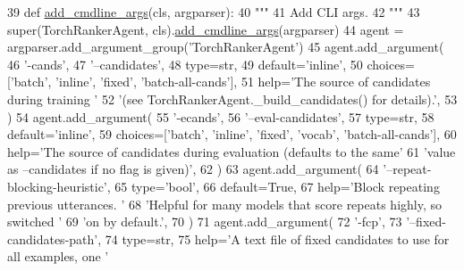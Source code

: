 \begin{DoxyCode}
39     \textcolor{keyword}{def }\hyperlink{namespaceparlai_1_1agents_1_1drqa_1_1config_a62fdd5554f1da6be0cba185271058320}{add\_cmdline\_args}(cls, argparser):
40         \textcolor{stringliteral}{"""}
41 \textcolor{stringliteral}{        Add CLI args.}
42 \textcolor{stringliteral}{        """}
43         super(TorchRankerAgent, cls).\hyperlink{namespaceparlai_1_1agents_1_1drqa_1_1config_a62fdd5554f1da6be0cba185271058320}{add\_cmdline\_args}(argparser)
44         agent = argparser.add\_argument\_group(\textcolor{stringliteral}{'TorchRankerAgent'})
45         agent.add\_argument(
46             \textcolor{stringliteral}{'-cands'},
47             \textcolor{stringliteral}{'--candidates'},
48             type=str,
49             default=\textcolor{stringliteral}{'inline'},
50             choices=[\textcolor{stringliteral}{'batch'}, \textcolor{stringliteral}{'inline'}, \textcolor{stringliteral}{'fixed'}, \textcolor{stringliteral}{'batch-all-cands'}],
51             help=\textcolor{stringliteral}{'The source of candidates during training '}
52             \textcolor{stringliteral}{'(see TorchRankerAgent.\_build\_candidates() for details).'},
53         )
54         agent.add\_argument(
55             \textcolor{stringliteral}{'-ecands'},
56             \textcolor{stringliteral}{'--eval-candidates'},
57             type=str,
58             default=\textcolor{stringliteral}{'inline'},
59             choices=[\textcolor{stringliteral}{'batch'}, \textcolor{stringliteral}{'inline'}, \textcolor{stringliteral}{'fixed'}, \textcolor{stringliteral}{'vocab'}, \textcolor{stringliteral}{'batch-all-cands'}],
60             help=\textcolor{stringliteral}{'The source of candidates during evaluation (defaults to the same'}
61             \textcolor{stringliteral}{'value as --candidates if no flag is given)'},
62         )
63         agent.add\_argument(
64             \textcolor{stringliteral}{'--repeat-blocking-heuristic'},
65             type=\textcolor{stringliteral}{'bool'},
66             default=\textcolor{keyword}{True},
67             help=\textcolor{stringliteral}{'Block repeating previous utterances. '}
68             \textcolor{stringliteral}{'Helpful for many models that score repeats highly, so switched '}
69             \textcolor{stringliteral}{'on by default.'},
70         )
71         agent.add\_argument(
72             \textcolor{stringliteral}{'-fcp'},
73             \textcolor{stringliteral}{'--fixed-candidates-path'},
74             type=str,
75             help=\textcolor{stringliteral}{'A text file of fixed candidates to use for all examples, one '}

\end{DoxyCode}
